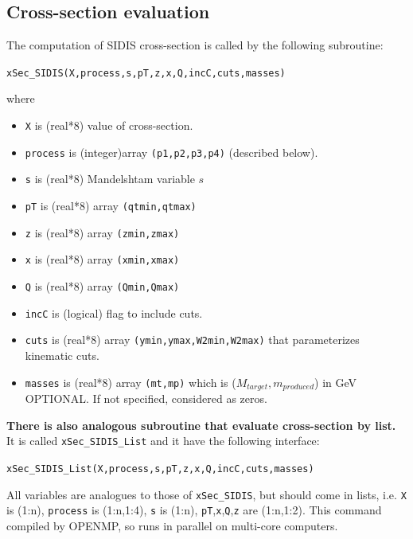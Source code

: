 \documentclass[prd,nofootinbib,eqsecnum,final]{revtex4}
\renewcommand{\(}{\left(}
\renewcommand{\)}{\right)}
\renewcommand{\[}{\left[}
\renewcommand{\]}{\right]}
\newcommand{\blue}[1]{{\color{blue} #1}}
\begin{document}
\subsection{Cross-section evaluation}
\label{TMDXs:xsec}

\begin{tcolorbox}
The computation of SIDIS cross-section is called by the following subroutine:

\begin{center}
\texttt{xSec\_SIDIS(X,process,s,pT,z,x,Q,incC,cuts,masses)}
\end{center}

where
\begin{itemize}
\item \texttt{X} is (real*8) value of cross-section.
\item \texttt{process} is (integer)array \texttt{(p1,p2,p3,p4)} (described below).
\item \texttt{s} is (real*8) Mandelshtam variable $s$
\item \texttt{pT} is (real*8) array \texttt{(qtmin,qtmax)}
\item \texttt{z} is (real*8) array \texttt{(zmin,zmax)}
\item \texttt{x} is (real*8) array \texttt{(xmin,xmax)}
\item \texttt{Q} is (real*8) array \texttt{(Qmin,Qmax)}
\item \texttt{incC} is (logical) flag to include cuts.
\item \texttt{cuts} is (real*8) array \texttt{(ymin,ymax,W2min,W2max)} that parameterizes kinematic cuts.
\item \texttt{masses} is (real*8) array \texttt{(mt,mp)} which is ($M_{target},m_{produced}$) in GeV \blue{OPTIONAL}. If not specified, considered as zeros.
\end{itemize}
\end{tcolorbox}

\begin{tcolorbox}
\textbf{\blue{There is also analogous subroutine that evaluate cross-section by list.}} It is called \texttt{xSec\_SIDIS\_List} and it have the following interface:

\begin{center}
\texttt{xSec\_SIDIS\_List(X,process,s,pT,z,x,Q,incC,cuts,masses)}
\end{center}
All variables are analogues to those of \texttt{xSec\_SIDIS}, but should come in lists, i.e. \texttt{X} is (1:n), \texttt{process} is (1:n,1:4), \texttt{s} is (1:n), \texttt{pT},\texttt{x},\texttt{Q},\texttt{z} are (1:n,1:2). This command compiled by OPENMP, so runs in parallel on multi-core computers.
\end{tcolorbox}
\end{document}
